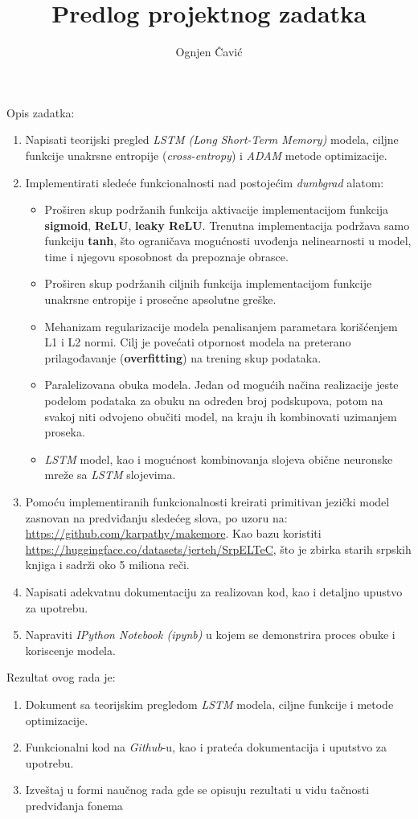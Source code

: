 \documentclass[12pt]{article}
\title{\vspace{-3cm}Predlog projektnog zadatka}
\author{Ognjen Čavić}
\date{}
\begin{document}
\maketitle
\hspace{-1cm}Opis zadatka:
\begin{enumerate}
        \item Napisati teorijski pregled \textit{LSTM (Long Short-Term Memory)} modela, ciljne funkcije unakrsne entropije (\textit{cross-entropy}) i \textit{ADAM} metode optimizacije.
        \item Implementirati sledeće funkcionalnosti nad postojećim \textit{dumbgrad} alatom:
        \begin{itemize}
          \item Proširen skup podržanih funkcija aktivacije implementacijom funkcija \textbf{sigmoid}, \textbf{ReLU}, \textbf{leaky ReLU}. Trenutna implementacija podržava samo funkciju \textbf{tanh}, što ograničava mogućnosti uvođenja nelinearnosti u model, time i njegovu sposobnost da prepoznaje obrasce.
          \item Proširen skup podržanih ciljnih funkcija implementacijom funkcije unakrsne entropije i prosečne apsolutne greške.
          \item Mehanizam regularizacije modela penalisanjem parametara korišćenjem L1 i L2 normi. Cilj je povećati otpornost modela na preterano prilagođavanje (\textbf{overfitting}) na trening skup podataka.
          \item Paralelizovana obuka modela. Jedan od mogućih načina realizacije jeste podelom podataka za obuku na određen broj podskupova, potom na svakoj niti odvojeno obučiti model, na kraju ih kombinovati uzimanjem proseka.
          \item \textit{LSTM} model, kao i mogućnost kombinovanja slojeva obične neuronske mreže sa \textit{LSTM} slojevima.
        \end{itemize}
        \item Pomoću implementiranih funkcionalnosti kreirati primitivan jezički model zasnovan na predviđanju sledećeg slova, po uzoru na: \url{https://github.com/karpathy/makemore}. Kao bazu koristiti \url{https://huggingface.co/datasets/jerteh/SrpELTeC}, što je zbirka starih srpskih knjiga i sadrži oko 5 miliona reči.
        \item Napisati adekvatnu dokumentaciju za realizovan kod, kao i detaljno upustvo za upotrebu.
        \item Napraviti \textit{IPython Notebook (ipynb)} u kojem se demonstrira proces obuke i koriscenje modela.
\end{enumerate}
\hspace{-0.5cm}Rezultat ovog rada je:
\begin{enumerate}
  \item Dokument sa teorijskim pregledom \textit{LSTM} modela, ciljne funkcije i metode optimizacije.
  \item Funkcionalni kod na \textit{Github}-u, kao i prateća dokumentacija i uputstvo za upotrebu.
  \item Izveštaj u formi naučnog rada gde se opisuju rezultati u vidu tačnosti predviđanja fonema

\end{enumerate}
\end{document}
